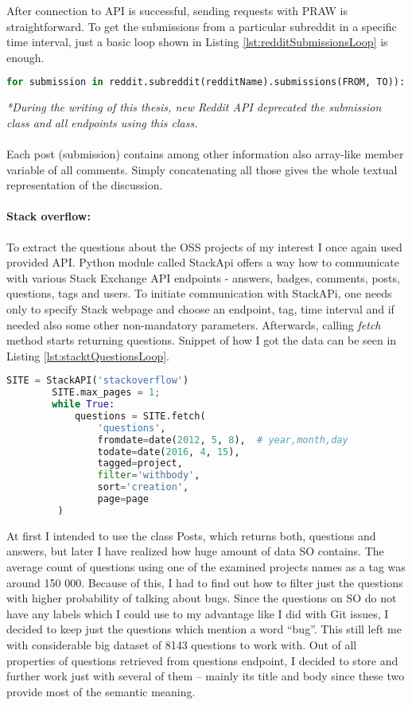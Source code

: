After connection to API is successful, sending requests with PRAW is straightforward. To get the submissions from a particular subreddit in a specific time interval, just a basic loop shown in Listing \ref{lst:redditSubmissionsLoop} is enough.

\begin{lstlisting}[caption={Getting posts from subreddit *},label={lst:redditSubmissionsLoop},language=Python]
for submission in reddit.subreddit(redditName).submissions(FROM, TO)):
\end{lstlisting}
\textit{*During the writing of this thesis, new Reddit API deprecated the submission class and all endpoints using this class.}\\
\\
Each post (submission) contains among other information also array-like member variable of all comments. Simply concatenating all those gives the whole textual representation of the discussion.


\paragraph{Stack overflow:}
To extract the questions about the OSS projects of my interest I once again used provided API. Python module called StackApi offers a way how to communicate with various Stack Exchange API endpoints - answers, badges, comments, posts, questions, tags and users. To initiate communication with StackAPi, one needs only to specify Stack webpage and choose an endpoint, tag, time interval and if needed also some other non-mandatory parameters. Afterwards, calling \textit{fetch} method starts returning questions. Snippet of how I got the data can be seen in Listing \ref{lst:stacktQuestionsLoop}.

\begin{lstlisting}[caption={Getting Stackoverflow questions with StackApi},label={lst:stacktQuestionsLoop},language=Python]
	SITE = StackAPI('stackoverflow')
    	SITE.max_pages = 1;
    	while True:
    		questions = SITE.fetch(
    			'questions',
    			fromdate=date(2012, 5, 8),  # year,month,day
        		todate=date(2016, 4, 15),
        		tagged=project,
        		filter='withbody',
        		sort='creation',
        		page=page
         )
\end{lstlisting}

At first I intended to use the class Posts, which returns both, questions and answers, but later I have realized how huge amount of data SO contains.  The average count of questions using one of the examined projects names as a tag was around 150 000. Because of this, I had to find out how to filter just the questions with higher probability of talking about bugs. Since the questions on SO do not have any labels which I could use to my advantage like I did with Git issues, I decided to keep just the questions which mention a word “bug”. This still left me with considerable big dataset of 8143 questions to work with. Out of all properties of questions retrieved from questions endpoint, I decided to store and further work just with several of them – mainly its title and body since these two provide most of the semantic meaning.